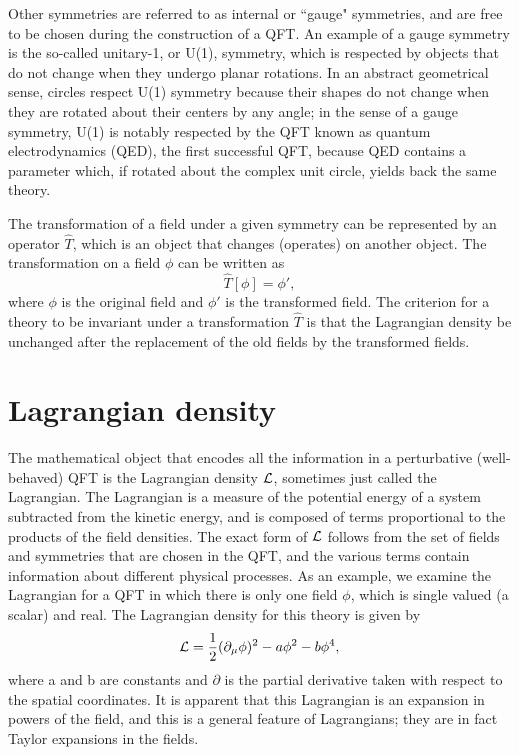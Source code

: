Other symmetries are referred to as internal or ``gauge" symmetries, and are free to be chosen during the construction of a QFT. An example of a gauge symmetry is the so-called unitary-1, or U(1), symmetry, which is respected by objects that do not change when they undergo planar rotations. In an abstract geometrical sense, circles respect U(1) symmetry because their shapes do not change when they are rotated about their centers by any angle; in the sense of a gauge symmetry, U(1) is notably respected by the QFT known as quantum electrodynamics (QED), the first successful QFT, because QED contains a parameter which, if rotated about the complex unit circle, yields back the same theory. 

The transformation of a field under a given symmetry can be represented by an operator $\hat{T}$, which is an object that changes (operates) on another object. The transformation on a field $\phi$ can be written as
\begin{equation}
\hat{T}[\phi] = \phi',
\end{equation}
where $\phi$ is the original field and $\phi'$ is the transformed field. The criterion for a theory to be invariant under a transformation $\hat{T}$ is that the Lagrangian density be unchanged after the replacement of the old fields by the transformed fields.

\section{Lagrangian density}
\label{sss:QFT}
 The mathematical object that encodes all the information in a perturbative (well-behaved) QFT is the Lagrangian density $\mathcal{L}$, sometimes just called the Lagrangian. The Lagrangian is a measure of the potential energy of a system subtracted from the kinetic energy, and is composed of terms proportional to the products of the field densities. The exact form of $\mathcal{L}$ follows from the set of fields and symmetries that are chosen in the QFT, and the various terms contain information about different physical processes. As an example, we examine the Lagrangian for a QFT in which there is only one field $\phi$, which is single valued (a scalar) and real. The Lagrangian density for this theory is given by
 \begin{equation}
 \mathcal{L} =  \frac{1}{2}(\partial_\mu \phi)^2  - a\phi^2 - b\phi^4,
 \label{eq:exLag}
 \end{equation} 
where a and b are constants and $\partial$ is the partial derivative taken with respect to the spatial coordinates. It is apparent that this Lagrangian is an expansion in powers of the field, and this is a general feature of Lagrangians; they are in fact Taylor expansions in the fields. 

